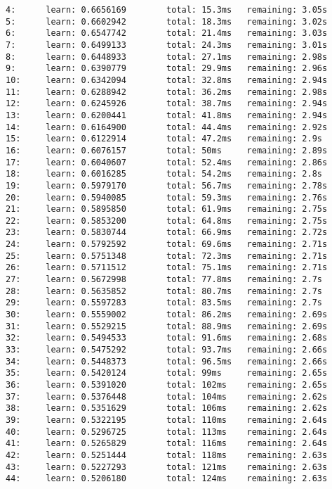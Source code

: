 \documentclass[11pt]{article}
\begin{document}
\begin{Verbatim}[commandchars=\\\{\}]
4:      learn: 0.6656169        total: 15.3ms   remaining: 3.05s
5:      learn: 0.6602942        total: 18.3ms   remaining: 3.02s
6:      learn: 0.6547742        total: 21.4ms   remaining: 3.03s
7:      learn: 0.6499133        total: 24.3ms   remaining: 3.01s
8:      learn: 0.6448933        total: 27.1ms   remaining: 2.98s
9:      learn: 0.6390779        total: 29.9ms   remaining: 2.96s
10:     learn: 0.6342094        total: 32.8ms   remaining: 2.94s
11:     learn: 0.6288942        total: 36.2ms   remaining: 2.98s
12:     learn: 0.6245926        total: 38.7ms   remaining: 2.94s
13:     learn: 0.6200441        total: 41.8ms   remaining: 2.94s
14:     learn: 0.6164900        total: 44.4ms   remaining: 2.92s
15:     learn: 0.6122914        total: 47.2ms   remaining: 2.9s
16:     learn: 0.6076157        total: 50ms     remaining: 2.89s
17:     learn: 0.6040607        total: 52.4ms   remaining: 2.86s
18:     learn: 0.6016285        total: 54.2ms   remaining: 2.8s
19:     learn: 0.5979170        total: 56.7ms   remaining: 2.78s
20:     learn: 0.5940085        total: 59.3ms   remaining: 2.76s
21:     learn: 0.5895850        total: 61.9ms   remaining: 2.75s
22:     learn: 0.5853200        total: 64.8ms   remaining: 2.75s
23:     learn: 0.5830744        total: 66.9ms   remaining: 2.72s
24:     learn: 0.5792592        total: 69.6ms   remaining: 2.71s
25:     learn: 0.5751348        total: 72.3ms   remaining: 2.71s
26:     learn: 0.5711512        total: 75.1ms   remaining: 2.71s
27:     learn: 0.5672998        total: 77.8ms   remaining: 2.7s
28:     learn: 0.5635852        total: 80.7ms   remaining: 2.7s
29:     learn: 0.5597283        total: 83.5ms   remaining: 2.7s
30:     learn: 0.5559002        total: 86.2ms   remaining: 2.69s
31:     learn: 0.5529215        total: 88.9ms   remaining: 2.69s
32:     learn: 0.5494533        total: 91.6ms   remaining: 2.68s
33:     learn: 0.5475292        total: 93.7ms   remaining: 2.66s
34:     learn: 0.5448373        total: 96.5ms   remaining: 2.66s
35:     learn: 0.5420124        total: 99ms     remaining: 2.65s
36:     learn: 0.5391020        total: 102ms    remaining: 2.65s
37:     learn: 0.5376448        total: 104ms    remaining: 2.62s
38:     learn: 0.5351629        total: 106ms    remaining: 2.62s
39:     learn: 0.5322195        total: 110ms    remaining: 2.64s
40:     learn: 0.5296725        total: 113ms    remaining: 2.64s
41:     learn: 0.5265829        total: 116ms    remaining: 2.64s
42:     learn: 0.5251444        total: 118ms    remaining: 2.63s
43:     learn: 0.5227293        total: 121ms    remaining: 2.63s
44:     learn: 0.5206180        total: 124ms    remaining: 2.63s

\end{Verbatim}
\end{document}
